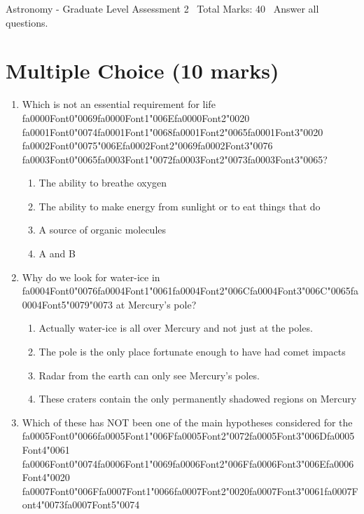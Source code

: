 \documentclass[12pt]{article}
\begin{document}
\begin{center}
Astronomy - Graduate Level Assessment 2 \
Total Marks: 40 \
Answer all questions.
\end{center}

\section*{Multiple Choice (10 marks)}
\begin{enumerate}[label=\arabic*.]
\item Which is not an essential requirement for life {\csname fa0000Font0\endcsname\char"0069}{\csname fa0000Font1\endcsname\char"006E}{\csname fa0000Font2\endcsname\char"0020} {\csname fa0001Font0\endcsname\char"0074}{\csname fa0001Font1\endcsname\char"0068}{\csname fa0001Font2\endcsname\char"0065}{\csname fa0001Font3\endcsname\char"0020} {\csname fa0002Font0\endcsname\char"0075}{\char"006E}{\csname fa0002Font2\endcsname\char"0069}{\csname fa0002Font3\endcsname\char"0076} {\csname fa0003Font0\endcsname\char"0065}{\csname fa0003Font1\endcsname\char"0072}{\csname fa0003Font2\endcsname\char"0073}{\csname fa0003Font3\endcsname\char"0065}?
\begin{enumerate}[label=(\alph*)]
    \item The ability to breathe oxygen
    \item The ability to make energy from sunlight or to eat things that do
    \item A source of organic molecules
    \item A and B
\end{enumerate}
\item Why do we look for water-ice in {\csname fa0004Font0\endcsname\char"0076}{\csname fa0004Font1\endcsname\char"0061}{\csname fa0004Font2\endcsname\char"006C}{\csname fa0004Font3\endcsname\char"006C}{\char"0065}{\csname fa0004Font5\endcsname\char"0079}{\char"0073} at Mercury's pole?
\begin{enumerate}[label=(\alph*)]
    \item Actually water-ice is all over Mercury and not just at the poles.
    \item The pole is the only place fortunate enough to have had comet impacts
    \item Radar from the earth can only see Mercury's poles.
    \item These craters contain the only permanently shadowed regions on Mercury
\end{enumerate}
\item Which of these has NOT been one of the main hypotheses considered for the {\csname fa0005Font0\endcsname\char"0066}{\csname fa0005Font1\endcsname\char"006F}{\csname fa0005Font2\endcsname\char"0072}{\csname fa0005Font3\endcsname\char"006D}{\csname fa0005Font4\endcsname\char"0061} {\csname fa0006Font0\endcsname\char"0074}{\csname fa0006Font1\endcsname\char"0069}{\csname fa0006Font2\endcsname\char"006F}{\csname fa0006Font3\endcsname\char"006E}{\csname fa0006Font4\endcsname\char"0020} {\csname fa0007Font0\endcsname\char"006F}{\csname fa0007Font1\endcsname\char"0066}{\csname fa0007Font2\endcsname\char"0020}{\csname fa0007Font3\endcsname\char"0061}{\csname fa0007Font4\endcsname\char"0073}{\csname fa0007Font5\endcsname\char"0074}

\end{enumerate}
\end{document}
